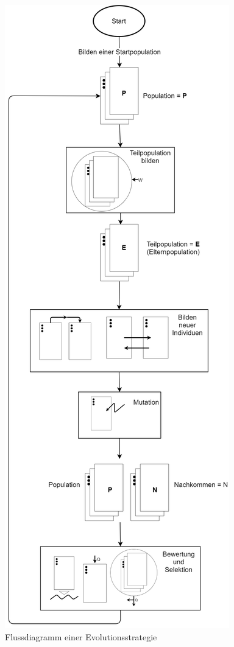 \begin{figure}[!htb]
	\centering
	\includegraphics[height=\textheight, keepaspectratio]{img/typisches_aussehen/es_grafik.png}
	\caption{Flussdiagramm einer Evolutionsstrategie}
	\label{fig:flowchart_es}
\end{figure}
